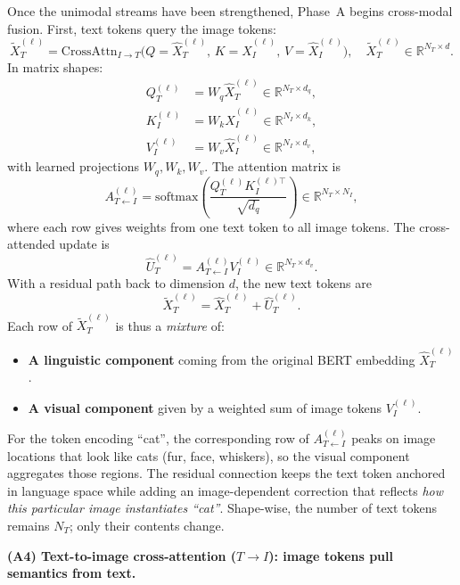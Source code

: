 \begin{enrichment}
\begin{enrichment}[Method][subsection]
		Once the unimodal streams have been strengthened, Phase~A begins cross-modal fusion. First, text tokens query the image tokens:
		\[
		\tilde{X}_T^{(\ell)} = \text{CrossAttn}_{I \rightarrow T}\bigl(Q = \hat{X}_T^{(\ell)},\, K = \hat{X}_I^{(\ell)},\, V = \hat{X}_I^{(\ell)}\bigr), \quad \tilde{X}_T^{(\ell)} \in \mathbb{R}^{N_T \times d}.
		\]
		In matrix shapes:
		\begin{align*}
			Q_T^{(\ell)} &= W_q \hat{X}_T^{(\ell)} \in \mathbb{R}^{N_T \times d_q},\\
			K_I^{(\ell)} &= W_k \hat{X}_I^{(\ell)} \in \mathbb{R}^{N_I \times d_k},\\
			V_I^{(\ell)} &= W_v \hat{X}_I^{(\ell)} \in \mathbb{R}^{N_I \times d_v},
		\end{align*}
		with learned projections \(W_q, W_k, W_v\). The attention matrix is
		\[
		A_{T \leftarrow I}^{(\ell)} = \text{softmax}\!\left(\frac{Q_T^{(\ell)} K_I^{(\ell)\top}}{\sqrt{d_q}}\right) \in \mathbb{R}^{N_T \times N_I},
		\]
		where each row gives weights from one text token to all image tokens. The cross-attended update is
		\[
		\hat{U}_T^{(\ell)} = A_{T \leftarrow I}^{(\ell)} V_I^{(\ell)} \in \mathbb{R}^{N_T \times d_v}.
		\]
		With a residual path back to dimension \(d\), the new text tokens are
		\[
		\tilde{X}_T^{(\ell)} = \hat{X}_T^{(\ell)} + \hat{U}_T^{(\ell)}.
		\]
		Each row of \(\tilde{X}_T^{(\ell)}\) is thus a \emph{mixture} of:
		\begin{itemize}
			\item \textbf{A linguistic component} coming from the original BERT embedding \(\hat{X}_T^{(\ell)}\).
			\item \textbf{A visual component} given by a weighted sum of image tokens \(V_I^{(\ell)}\).
		\end{itemize}
		For the token encoding ``cat'', the corresponding row of \(A_{T \leftarrow I}^{(\ell)}\) peaks on image locations that look like cats (fur, face, whiskers), so the visual component aggregates those regions. The residual connection keeps the text token anchored in language space while adding an image-dependent correction that reflects \emph{how this particular image instantiates ``cat''}. Shape-wise, the number of text tokens remains \(N_T\); only their contents change.
		
		\medskip
		
		\noindent\textbf{(A4) Text-to-image cross-attention (\(T \rightarrow I\)): image tokens pull semantics from text.}
		

\end{enrichment}
\end{enrichment}
